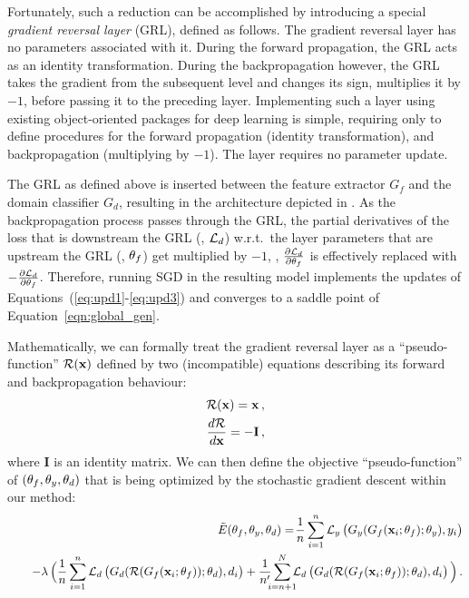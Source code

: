 Fortunately, such a reduction can be accomplished by introducing a special \emph{gradient reversal layer} (GRL), defined as follows. The gradient reversal layer has no parameters associated with it.
During the forward propagation, the GRL acts as an identity transformation. During the backpropagation however, the GRL takes the gradient from the subsequent level and changes its sign, \ie multiplies it by $-1$, before passing it to the preceding layer. Implementing such a layer using existing object-oriented packages for deep learning is simple, requiring only to define procedures for the forward propagation (identity transformation), and backpropagation (multiplying by $-1$). The layer requires no parameter update. 

The GRL as defined above is inserted between the feature extractor $G_f$ and the domain classifier $G_d$, resulting in the architecture depicted in . As the backpropagation process passes through the GRL, the partial derivatives of the loss that is downstream the GRL (\ie, ${\mathcal{L}}_d$) w.r.t.\ the layer parameters that are upstream the GRL (\ie, ${\theta_f}$) get multiplied by $-1$, \ie, $\frac{\partial {\mathcal{L}}_d}{\partial {\theta_f}}$ is effectively replaced with $-\frac{\partial {\mathcal{L}}_d}{\partial {\theta_f}}$. Therefore, running SGD in the resulting model implements the updates of Equations~(\ref{eq:upd1}-\ref{eq:upd3}) and converges to a saddle point of Equation~\eqref{eqn:global_gen}.

Mathematically, we can formally treat the gradient reversal layer as a ``pseudo-function'' ${\cal R}({\mathbf x})$ defined by two (incompatible) equations describing its forward and backpropagation behaviour:
\begin{align}
{\cal R}({\mathbf x}) = {\mathbf x}\,,\\
\frac{d{\cal R}}{d{\mathbf x}} = -\mathbf{I}\,,
\end{align}
where $\mathbf{I}$ is an identity matrix.
We can then define the objective ``pseudo-function'' of $({\theta_f},{\theta_y},{\theta_d})$ that is being optimized by the stochastic gradient descent within our method:
\begin{eqnarray}
&&\tilde E (\tf,\ty,\td) = \! \frac{1}{n}\sum_{i=1}^n \Lcal_y\left( \strut G_y(G_f(\x_i;\tf);\ty), y_i\right)\label{eq:pseudoobj}\\
&&~~~- \lambda \,\Big(\frac{1}{n} \sum_{i=1}^{n} \Lcal_d \left( \strut G_d({\cal R}(G_f(\x_i;\tf));\td), d_i\right) + \frac{1}{n'} \sum_{\mathclap{i=n+1}}^{N} \Lcal_d \left( \strut G_d({\cal R}(G_f(\x_i;\tf));\td), d_i\right) \Big)\,.\nonumber
\end{eqnarray}

